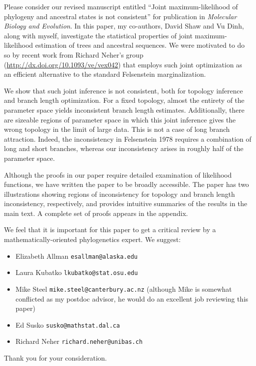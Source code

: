 \documentclass[letterpaper,10pt]{article}
\begin{document}
Please consider our revised manuscript entitled ``Joint maximum-likelihood of phylogeny and ancestral states is not consistent'' for publication in \textit{Molecular Biology and Evolution}.
In this paper, my co-authors, David Shaw and Vu Dinh, along with myself, investigate the statistical properties of joint maximum-likelihood estimation of trees and ancestral sequences.
We were motivated to do so by recent work from Richard Neher's group (\url{http://dx.doi.org/10.1093/ve/vex042}) that employs such joint optimization as an efficient alternative to the standard Felsenstein marginalization.

We show that such joint inference is not consistent, both for topology inference and branch length optimization.
For a fixed topology, almost the entirety of the parameter space yields inconsistent branch length estimates.
Additionally, there are sizeable regions of parameter space in which this joint inference gives the wrong topology in the limit of large data.
This is not a case of long branch attraction.
Indeed, the inconsistency in Felsenstein 1978 requires a combination of long and short branches, whereas our inconsistency arises in roughly half of the parameter space.

Although the proofs in our paper require detailed examination of likelihood functions, we have written the paper to be broadly accessible.
The paper has two illustrations showing regions of inconsistency for topology and branch length inconsistency, respectively, and provides intuitive summaries of the results in the main text.
A complete set of proofs appears in the appendix.

We feel that it is important for this paper to get a critical review by a mathematically-oriented phylogenetics expert.
We suggest:
\begin{itemize}
\setlength\itemsep{1.4pt}
\item Elizabeth Allman \texttt{esallman@alaska.edu}
\item Laura Kubatko \texttt{lkubatko@stat.osu.edu}
\item Mike Steel \texttt{mike.steel@canterbury.ac.nz} (although Mike is somewhat conflicted as my postdoc advisor, he would do an excellent job reviewing this paper)
\item Ed Susko \texttt{susko@mathstat.dal.ca}
\item Richard Neher \texttt{richard.neher@unibas.ch}
\end{itemize}

Thank you for your consideration.
\end{document}
